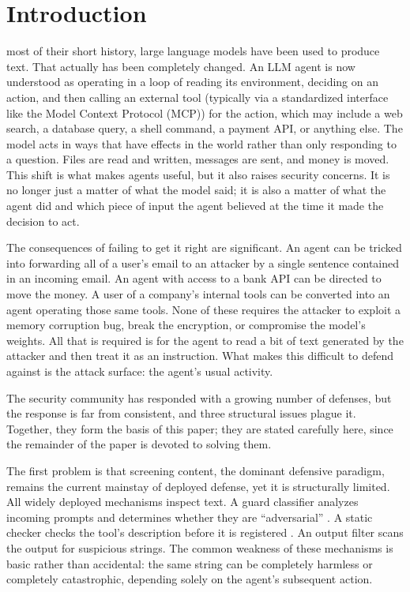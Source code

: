 \documentclass[journal]{IEEEtran}
\theoremstyle{remark}
\begin{document}
\section{Introduction}

 most of their short history, large language models have been used to produce text. That actually has been completely changed. An LLM agent is now understood as operating in a loop of reading its environment, deciding on an action, and then calling an external tool (typically via a standardized interface like the Model Context Protocol (MCP)) for the action, which may include a web search, a database query, a shell command, a payment API, or anything else. The model acts in ways that have effects in the world rather than only responding to a question. Files are read and written, messages are sent, and money is moved. This shift is what makes agents useful, but it also raises security concerns. It is no longer just a matter of what the model said; it is also a matter of what the agent did and which piece of input the agent believed at the time it made the decision to act.

The consequences of failing to get it right are significant. An agent can be tricked into forwarding all of a user's email to an attacker by a single sentence contained in an incoming email. An agent with access to a bank API can be directed to move the money. A user of a company's internal tools can be converted into an agent operating those same tools. None of these requires the attacker to exploit a memory corruption bug, break the encryption, or compromise the model's weights. All that is required is for the agent to read a bit of text generated by the attacker and then treat it as an instruction. What makes this difficult to defend against is the attack surface: the agent's usual activity.

The security community has responded with a growing number of defenses, but the response is far from consistent, and three structural issues plague it. Together, they form the basis of this paper; they are stated carefully here, since the remainder of the paper is devoted to solving them.

The first problem is that screening content, the dominant defensive paradigm, remains the current mainstay of deployed defense, yet it is structurally limited. All widely deployed mechanisms inspect text. A guard classifier analyzes incoming prompts and determines whether they are ``adversarial'' \cite{r1,r2}. A static checker checks the tool's description before it is registered \cite{r3} \cite{r4}. An output filter scans the output for suspicious strings. The common weakness of these mechanisms is basic rather than accidental: the same string can be completely harmless or completely catastrophic, depending solely on the agent's subsequent action.
\end{document}
